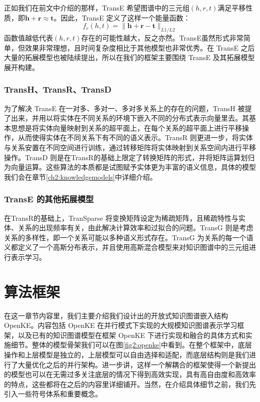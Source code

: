        正如我们在前文中介绍的那样，TransE \cite{bordes2013translating} 希望图谱中的三元组$(h, r, t)$满足平移性质，即$\mathbf{h} + \mathbf{r} \approx \mathbf{t}$。因此，TransE 定义了这样一个能量函数：
        \begin{equation}
        f_{r}(h, t) = \lVert \mathbf{h} + \mathbf{r} - \mathbf{t} \rVert_{L1/L2}
        \end{equation}
       函数值越低代表$(h, r, t)$存在的可能性越大，反之亦然。TransE虽然形式非常简单，但效果非常理想，且时间复杂度相比于其他模型也非常优秀。在 TransE 之后大量的拓展模型也被陆续提出，所以在我们的框架主要围绕 TransE 及其拓展模型展开构建。

      \subsubsection{TransH、TransR、TransD}

      为了解决 TransE 在一对多、多对一、多对多关系上的存在的问题，TransH \cite{wang2014knowledge}被提了出来，并用以将实体在不同关系的环境下嵌入不同的分布式表示向量里去。其基本思想是将实体向量映射到关系的超平面上，在每个关系的超平面上进行平移操作，从而使得实体在不同关系下有不同的语义表示。TransR 则更进一步，将实体与关系安置在不同空间进行训练，通过转移矩阵将实体映射到关系空间内进行平移操作。TransD 则是在TransR的基础上限定了转换矩阵的形式，并将矩阵运算划归为向量运算。这些算法的本质都是试图赋予实体更为丰富的语义信息，具体的模型我们会在章节\ref{ch2:knowledgemodels}中详细介绍。

      \subsubsection{TransE 的其他拓展模型}

      在TransR的基础上，TranSparse \cite{ji2016knowledge} 将变换矩阵设定为稀疏矩阵，且稀疏特性与实体、关系的出现频率有关，由此解决计算效率和过拟合的问题。TransG \cite{xiao2015transg} 则是考虑关系的多样性，即一个关系可能以多种语义形式存在。TransG 为关系的每一个语义都定义了一个高斯分布表示，并且使用高斯混合模型来对知识图谱中的三元组进行表示学习。


\section{算法框架}

在这一章节内容里，我们主要介绍我们设计出的开放式知识图谱嵌入结构 OpenKE。内容包括 OpenKE 在并行模式下实现的大规模知识图谱表示学习框架，以及已有的知识图谱模型在框架 OpenKE 下进行实现和融合的具体方式和实施细节。整体的模型骨架我们可以在图\ref{fig2:openke}中看到。在整个框架中，底层操作和上层模型是独立的，上层模型可以自由选择和适配，而底层结构则是我们进行了大量优化之后的并行架构。进一步讲，这样一个解耦合的框架使得一个新提出的模型也可以在无需过多关注底层的情况下得到高效实现，具有高自由度和高效率的特点，这些都将在之后的内容里详细铺开。当然，在介绍具体细节之前，我们先引入一些符号体系和重要概念。



